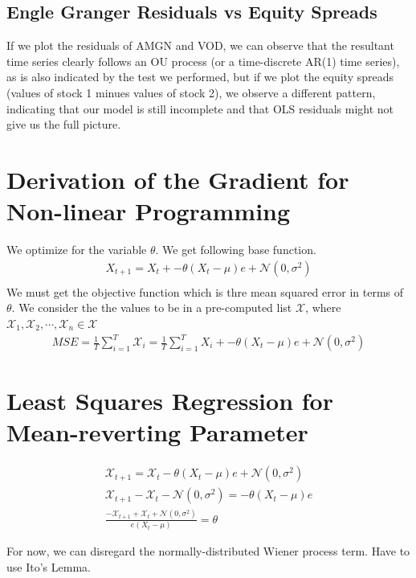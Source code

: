 \documentclass{article}
\begin{document}
\begin{spacing}{2.0}
\subsection{Engle Granger Residuals vs Equity Spreads}

If we plot the residuals of AMGN and VOD, we can observe that the resultant time series clearly follows an OU process (or a time-discrete AR(1) time series), as is also indicated
by the test we performed, but if we plot the equity spreads (values of stock 1 minues values of stock 2), we observe a different pattern, indicating that our model is still incomplete
and that OLS residuals might not give us the full picture.




\section{Derivation of the Gradient for Non-linear Programming}

We optimize for the variable $\theta$. We get following base function.
\begin{gather*}
    X_{t + 1} = X_{t} + -\theta(X_{t} - \mu)e + \mathcal{N}(0, \sigma^{2}) \\
\end{gather*}
We must get the objective function which is thre mean squared error in terms of $\theta$.
We consider the the values to be in a pre-computed list $\mathcal{X}$, where $\mathcal{X}_{1}, \mathcal{X}_{2}, \cdots, \mathcal{X}_{n} \in \mathcal{X}$
\begin{gather*}
    MSE = \frac{1}{T} \sum_{i = 1}^{T} \mathcal{X}_{i} = \frac{1}{T} \sum_{i = 1}^{T} X_{i} + -\theta(X_{t} - \mu)e + \mathcal{N}(0, \sigma^{2})
\end{gather*}

\section{Least Squares Regression for Mean-reverting Parameter}
\begin{gather*}
    \mathcal{X}_{t + 1} = \mathcal{X}_{t} - \theta (X_{t} - \mu)e + \mathcal{N}(0, \sigma^{2}) \\
    \mathcal{X}_{t + 1} - \mathcal{X}_{t} - \mathcal{N}(0, \sigma^{2}) = -\theta (X_{t} - \mu)e  \\
    \frac{- \mathcal{X}_{t + 1} + \mathcal{X}_{t} + \mathcal{N}(0, \sigma^{2})}{e(X_{t} - \mu)} = \theta
\end{gather*}

For now, we can disregard the normally-distributed Wiener process term.
Have to use Ito's Lemma.

\end{spacing}
\end{document}
